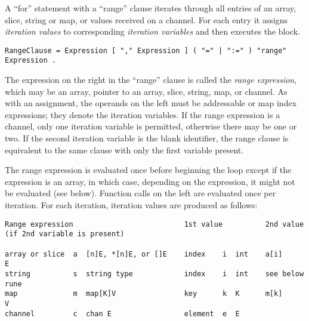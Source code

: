 {A ``for'' statement with a ``range'' clause iterates through all entries
of an array, slice, string or map, or values received on a channel. For
each entry it assigns \emph{iteration values} to corresponding
\emph{iteration variables} and then executes the block.

\begin{Verbatim}[frame=single]
RangeClause = Expression [ "," Expression ] ( "=" | ":=" ) "range" Expression .
\end{Verbatim}

The expression on the right in the ``range'' clause is called the
\emph{range expression}, which may be an array, pointer to an array,
slice, string, map, or channel. As with an assignment, the operands on
the left must be addressable or map index
expressions; they denote the iteration variables. If the range
expression is a channel, only one iteration variable is permitted,
otherwise there may be one or two. If the second iteration variable is
the blank identifier, the range clause is
equivalent to the same clause with only the first variable present.

The range expression is evaluated once before beginning the loop except
if the expression is an array, in which case, depending on the
expression, it might not be evaluated (see below). Function calls on the
left are evaluated once per iteration. For each iteration, iteration
values are produced as follows:

\begin{Verbatim}[frame=single]
Range expression                          1st value          2nd value (if 2nd variable is present)

array or slice  a  [n]E, *[n]E, or []E    index    i  int    a[i]       E
string          s  string type            index    i  int    see below  rune
map             m  map[K]V                key      k  K      m[k]       V
channel         c  chan E                 element  e  E
\end{Verbatim}

}
